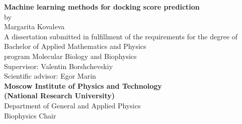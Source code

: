 \begin{center}
\thispagestyle{empty}
\hfill \break
\LARGE{\textbf{Machine learning methods for docking score prediction}}\\
\Large{by\\
Margarita Kovaleva}\\
\hfill \break
\hfill \break
\hfill \break
\large{A dissertation submitted in fulfillment of the requirements for the degree of Bachelor of Applied Mathematics and Physics\\
\hfill \break
program Molecular Biology and Biophysics}\\
\hfill \break
\hfill \break
\hfill \break
\Large{Supervisor: Valentin Borshchevskiy}\\
\Large{Scientific advisor: Egor Marin}\\
\hfill \break
\hfill \break
\hfill \break
\large{\textbf{Moscow Institute of Physics and Technology\\ (National Research University)}}\\
\hfill \break
\large{Department of General and Applied Physics\\
Biophysics Chair}\\
\hfill \break
\hfill {} \end{center}
 
\newpage